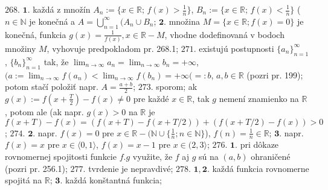 $\boxed{268.}$ $\boldsymbol{1.}$ každá z množín $ A_{n}:=\lbrace x \in \mathbb{R}; \, f(x)>\frac{1}{n}\rbrace $,  $ B_{n}:=\lbrace x \in \mathbb{R}; \, f(x)<\frac{1}{n}\rbrace $ ($ n \in \mathbb{N}$ je konečná a $A = \bigcup\limits_{n=1}^\infty (A_{n} \cup  B_{n} $;
$\boldsymbol{2.}$ množina  $ M=\lbrace x \in \mathbb{R};f(x)=0 \rbrace  $ je konečná, funkcia  $g(x) = \frac{1}{f(x)}, x \in \mathbb{R}-M $, vhodne dodefinovaná v bodoch množiny $M$, vyhovuje predpokladom pr. 268.1;
$\boxed{271.}$ existujú postupnosti $\lbrace a_{n}\rbrace_{n=1}^{\infty} $, $\lbrace b_{n}\rbrace_{n=1}^{\infty}$ tak, že $  \lim_{n \to \infty}a_n =\lim_{n \to \infty}b_n = +\infty$, $(a:=\lim_{n \to \infty}f(a_n)<\lim_{n \to \infty}f(b_n) = +\infty (=:b$, $a,b \in \mathbb{R}$ (pozri pr. 199); potom stačí položiť napr. $A=\frac{a+b}{2} $;
$\boxed{273.}$ sporom; ak $g(x):=f(x+ \frac{T}{2})-f(x) \ne 0$ pre každé $x\in \mathbb{R}$, tak $g$ nemení znamienko na $ \mathbb{R}$, potom ale (ak napr. $g(x) >0 $ na  $\mathbb{R} $ je  $f(x+T) - f(x)= (f(x+T)-f(x+T/2))+(f(x+T/2)-f(x)) >0$;
$\boxed{274.}$ $\boldsymbol{2.}$ napr. $f(x)=0$ pre  $x\in \mathbb{R}-(\mathbb{N} \cup \lbrace \frac{1}{n}; n\in \mathbb{N} \rbrace$), $f(n)=\frac{1}{n} \in \mathbb{R}$;
$\boldsymbol{3.}$ napr. $f(x)=x$ pre  $x\in \langle 0,1\rangle $, $f(x)=x-1$ pre  $x\in (2,3\rangle $;
$\boxed{276.}$ $\boldsymbol{1.}$ pri dôkaze rovnomernej spojitosti funkcie $f.g$ využite, že $f$ aj $g$ sú na $(a,b)$ ohraničené (pozri pr. 256.1);
$\boxed{277.}$ tvrdenie je nepravdivé;
$\boxed{278.}$ $\boldsymbol{1,2.}$ každá funkcia rovnomerne spojitá na $\mathbb{R}$;
$\boldsymbol{3.}$ každá konštantná funkcia;
